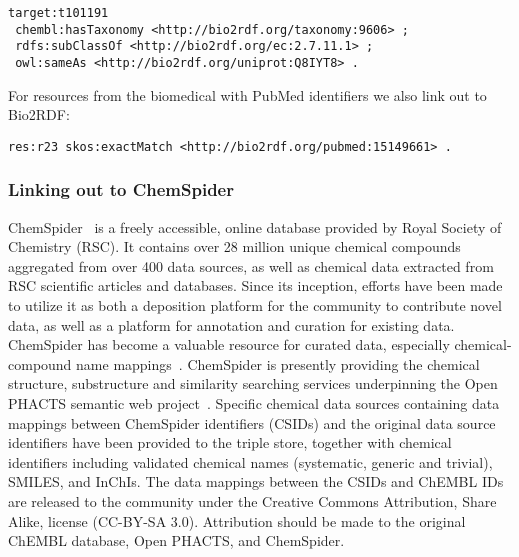 \documentclass[10pt]{bmc_article}
\newenvironment{bmcformat}{\begin{raggedright}\baselineskip20pt\sloppy\setboolean{publ}{false}}{\end{raggedright}\baselineskip20pt\sloppy}
\begin{document}
\begin{bmcformat}
%
%

\begin{small}
\begin{verbatim}
target:t101191
 chembl:hasTaxonomy <http://bio2rdf.org/taxonomy:9606> ;
 rdfs:subClassOf <http://bio2rdf.org/ec:2.7.11.1> ;
 owl:sameAs <http://bio2rdf.org/uniprot:Q8IYT8> .
\end{verbatim}
\end{small}

For resources from the biomedical with PubMed identifiers we also link out to Bio2RDF:

\begin{small}
\begin{verbatim}
res:r23 skos:exactMatch <http://bio2rdf.org/pubmed:15149661> .
\end{verbatim}
\end{small}

\subsubsection*{Linking out to ChemSpider}

ChemSpider~\cite{Pence2010} is a freely accessible, online database provided by Royal Society of Chemistry (RSC).
It contains over 28 million unique
chemical compounds aggregated from over 400 data sources, as well as chemical data extracted
from RSC scientific articles and databases. Since its inception, efforts have been made to
utilize it as both a deposition platform for the community to contribute novel data, as
well as a platform for annotation and curation for existing data. ChemSpider has become a
valuable resource for curated data, especially chemical-compound name mappings~\cite{Williams2011}. ChemSpider
is presently providing the chemical structure, substructure and similarity searching services 
underpinning the Open PHACTS semantic web project~\cite{Williams2012}. Specific chemical data 
sources containing data mappings between ChemSpider identifiers (CSIDs) and the original data 
source identifiers have been provided to the triple store, together with chemical identifiers 
including validated chemical names (systematic, generic and trivial), SMILES, and InChIs. 
The data mappings between the CSIDs and ChEMBL IDs are released to the 
community under the Creative Commons Attribution, Share Alike, license (CC-BY-SA 3.0). Attribution 
should be made to the original ChEMBL database, Open PHACTS, and ChemSpider.


\end{bmcformat}
\end{document}
